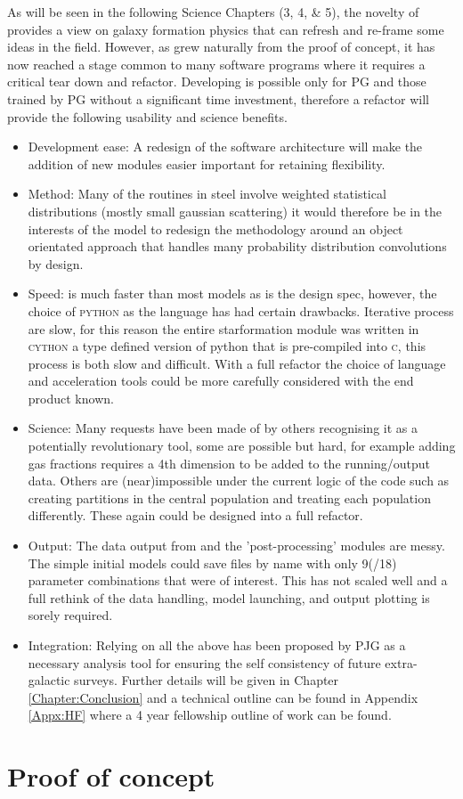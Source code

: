As will be seen in the following Science Chapters (3, 4, \& 5), the novelty of \steel provides a view on galaxy formation physics that can refresh and re-frame some ideas in the field. However, as \steel grew naturally from the proof of concept, it has now reached a stage common to many software programs where it requires a critical tear down and refactor. Developing \steel is possible only for PG and those trained by PG without a significant time investment, therefore a refactor will provide the following usability and science benefits. 
\begin{itemize}
    \item Development ease: A redesign of the software architecture will make the addition of new modules easier important for retaining flexibility.
    \item Method: Many of the routines in steel involve weighted statistical distributions (mostly small gaussian scattering) it would therefore be in the interests of the model to redesign the methodology around an object orientated approach that handles many probability distribution convolutions by design.
    \item Speed: \steel is much faster than most models as is the design spec, however, the choice of \textsc{python} as the language has had certain drawbacks.  Iterative process are slow, for this reason the entire starformation module was written in \textsc{cython} a type defined version of python that is pre-compiled into \textsc{c}, this process is both slow and difficult. With a full refactor the choice of language and acceleration tools could be more carefully considered with the end product known.
    \item Science: Many requests have been made of \steel by others recognising it as a potentially revolutionary tool, some are possible but hard, for example adding gas fractions requires a 4th dimension to be added to the running/output data. Others are (near)impossible under the current logic of the code such as creating partitions in the central population and treating each population differently. These again could be designed into a full refactor.
    \item Output: The data output from \steel and the 'post-processing' modules are messy. The simple initial models could save files by name with only 9(/18) parameter combinations that were of interest. This has not scaled well and a full rethink of the data handling, model launching, and output plotting is sorely required.
    \item Integration: Relying on all the above \steel has been proposed by PJG as a necessary analysis tool for ensuring the self consistency of future extra-galactic surveys. Further details will be given in Chapter \ref{Chapter:Conclusion} and a technical outline can be found in Appendix \ref{Appx:HF} where a 4 year fellowship outline of work can be found.
\end{itemize}

\pagebreak
\section{Proof of concept}
\label{sec:Proof}
\inputminted{python}{Codes/Proof.py}
